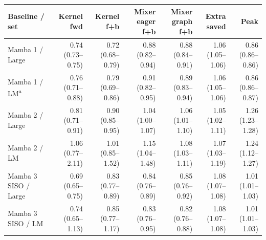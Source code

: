 \begin{tabular}{@{}lrrrrrr@{}}
\toprule
Baseline / set & Kernel fwd & Kernel f+b & Mixer eager f+b & Mixer graph f+b & Extra saved & Peak \\
\midrule
Mamba 1 / Large & 0.74 (0.73--0.75) & 0.72 (0.68--0.79) & 0.88 (0.82--0.94) & 0.88 (0.84--0.91) & 1.06 (1.05--1.06) & 0.86 (0.86--0.86) \\
Mamba 1 / LM\textsuperscript{a} & 0.76 (0.71--0.88) & 0.79 (0.69--0.86) & 0.91 (0.82--0.95) & 0.89 (0.83--0.94) & 1.06 (1.05--1.06) & 0.86 (0.86--0.87) \\
Mamba 2 / Large & 0.81 (0.71--0.91) & 0.90 (0.85--0.95) & 1.04 (1.00--1.07) & 1.06 (1.01--1.10) & 1.05 (1.02--1.11) & 1.26 (1.23--1.28) \\
Mamba 2 / LM & 1.06 (0.77--2.11) & 1.01 (0.85--1.52) & 1.15 (1.04--1.48) & 1.08 (1.03--1.11) & 1.07 (1.03--1.19) & 1.24 (1.12--1.27) \\
Mamba 3 SISO / Large & 0.69 (0.65--0.75) & 0.83 (0.77--0.89) & 0.84 (0.76--0.89) & 0.85 (0.76--0.92) & 1.08 (1.07--1.08) & 1.01 (1.01--1.03) \\
Mamba 3 SISO / LM & 0.74 (0.65--1.13) & 0.85 (0.77--1.17) & 0.83 (0.76--0.95) & 0.82 (0.76--0.88) & 1.08 (1.07--1.08) & 1.01 (1.01--1.03) \\
\bottomrule
\end{tabular}
